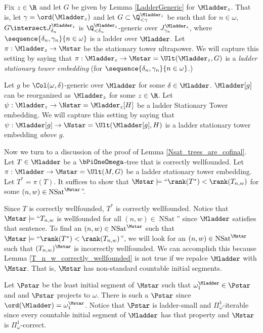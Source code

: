 \documentclass[oneside,12pt]{amsart}
\DeclareMathOperator{\NSat}{NSat}
\begin{document}
\begin{definition}
\label{LadderStationaryTowerEmbedding}
Fix $z\in\R$ and let $G$ be given by Lemma \ref{LadderGeneric} for $\Mladder_z$. That is,
let $\gamma=\ord(\Mladder_z)$ and let $G\subset \Q_{<\gamma}^{\Mladder_z}$ be such that for
$n\in\omega$, $G\intersect J^{\Mladder_z}_{\delta_n}$ is
$\Q_{<\delta_n}^{\Mladder_z}$-generic over $J^{\Mladder_z}_{\gamma_n}$, where
$\sequence{\delta_n,\gamma_n}{n\in\omega}$ is a ladder over $\Mladder$.
Let $\pi:\Mladder_z\to\Mstar$ be the stationary tower ultrapower.
We will capture this setting by saying that  $\pi:\Mladder_z\to\Mstar=\Ult(\Mladder_z,G)$
is a \emph{ladder stationary tower embedding} (for $\sequence{\delta_n,\gamma_n}{n\in\omega}$.)

Let $g$ be $\Col(\omega,\delta)$-generic over $\Mladder$ for some
$\delta\in\Mladder$.
$\Mladder[g]$ can be reorganized as $\Mladder_z$ for some $z\in\R$.
Let $\psi:\Mladder_z\to\Nstar=\Mladder_z[H]$ be a ladder Stationary Tower embedding.
We will capture this setting by saying that
$\psi:\Mladder[g]\to\Nstar=\Ult(\Mladder[g],H)$ is a ladder stationary tower embedding \emph{above $g$}.
\end{definition}

Now we turn to a discussion of the proof of Lemma \ref{Nsat_trees_are_cofinal}.
Let $T\in\Mladder$ be a $\bPiOneOmega$-tree that is correctly wellfounded.
Let $\pi:\Mladder\to\Mstar=\Ult(M,G)$ be a ladder stationary tower embedding.
Let $T^* = \pi(T)$. It suffices to show that
$\Mstar\models\text{``}\rank(T^*) < \rank(T_{n,w})$ for some $(n,w)\in \NSat^{\Mstar}$''.

Since $T$ is correctly wellfounded, $T^*$ is correctly wellfounded.
Notice that $\Mstar\models\text{``}T_{n,w}$ is wellfounded for all $(n,w)\in \NSat$''
since $\Mladder$ satisfies that sentence. To find an $(n,w)\in \NSat^{\Mstar}$ such that
$\Mstar\models\text{``}\rank(T^*) < \rank(T_{n,w})$'', we will look for an
$(n,w)\in \NSat^{\Mstar}$
such that $(T_{n,w})^{\Mstar}$ is incorrectly wellfounded.
We can accomplish this because Lemma \ref{T_n_w_correctly_wellfounded} is not
true if we repalce $\Mladder$ with $\Mstar$. That is, $\Mstar$ has non-standard
countable initial segments.

Let $\Pstar$ be the least initial segment of $\Mstar$ such that
$\omega_1^{\Mladder}\in\Pstar$ and
and $\Pstar$ projects to $\omega$. There is such a $\Pstar$ since
$\ord(\Mladder)=\omega_1^{\Mstar}$. Notice that $\Pstar$ is ladder-small and
$\Pi^1_{\omega}$-iterable since every countable initial segment of $\Mladder$
has that property and $\Mstar$ is $\Pi^1_{\omega}$-correct.
\end{document}
